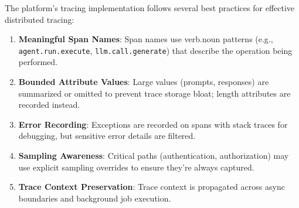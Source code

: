 The platform's tracing implementation follows several best practices for effective distributed tracing:

\begin{enumerate}
    \item \textbf{Meaningful Span Names}: Span names use verb.noun patterns (e.g., \texttt{agent.run.execute}, \texttt{llm.call.generate}) that describe the operation being performed.
    
    \item \textbf{Bounded Attribute Values}: Large values (prompts, responses) are summarized or omitted to prevent trace storage bloat; length attributes are recorded instead.
    
    \item \textbf{Error Recording}: Exceptions are recorded on spans with stack traces for debugging, but sensitive error details are filtered.
    
    \item \textbf{Sampling Awareness}: Critical paths (authentication, authorization) may use explicit sampling overrides to ensure they're always captured.
    
    \item \textbf{Trace Context Preservation}: Trace context is propagated across async boundaries and background job execution.
\end{enumerate}

